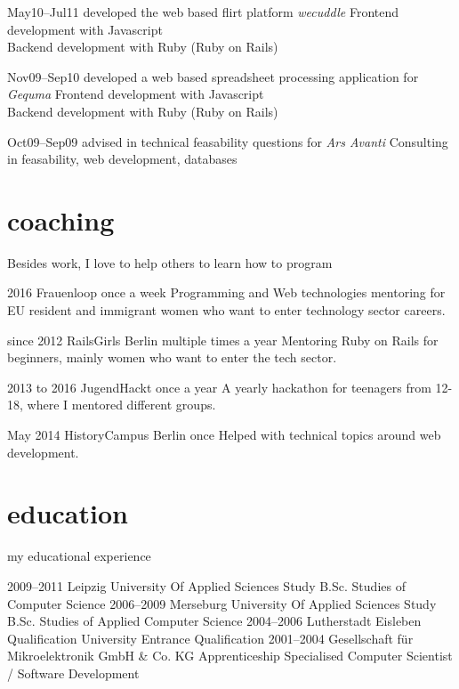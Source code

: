 \documentclass[]{friggeri-cv}
\begin{document}
\begin{entrylist}
  \entry
    {May10–Jul11}
    {developed the web based flirt platform \emph{wecuddle}}
    {}
    {Frontend development with Javascript\\
     Backend development with Ruby (Ruby on Rails)}

  \entry
    {Nov09–Sep10}
    {developed a web based spreadsheet processing application for \emph{Gequma}}
    {}
    {Frontend development with Javascript\\
     Backend development with Ruby (Ruby on Rails)}

  \entry
    {Oct09–Sep09}
    {advised in technical feasability questions for \emph{Ars Avanti}}
    {}
    {Consulting in feasability, web development, databases}


\end{entrylist}


\pagebreak
\section{coaching}
Besides work, I love to help others to learn how to program

\begin{entrylist}
  \entry
    {2016}
    {Frauenloop}
    {once a week}
    {Programming and Web technologies mentoring for EU resident and immigrant women who want to enter technology sector careers.}

  \entry
    {since 2012}
    {RailsGirls Berlin}
    {multiple times a year}
    {Mentoring Ruby on Rails for beginners, mainly women who want to enter the tech sector.}

  \entry
    {2013 to 2016}
    {JugendHackt}
    {once a year}
    {A yearly hackathon for teenagers from 12-18, where I mentored different groups.}

  \entry
    {May 2014}
    {HistoryCampus Berlin}
    {once}
    {Helped with technical topics around web development.}

\end{entrylist}


\section{education}
my educational experience

\begin{entrylist}
  \entry
    {2009–2011}
    {Leipzig University Of Applied Sciences}
    {Study B.Sc.}
    {Studies of Computer Science}
  \entry
    {2006–2009}
    {Merseburg University Of Applied Sciences}
    {Study B.Sc.}
    {Studies of Applied Computer Science}
  \entry
    {2004–2006}
    {Lutherstadt Eisleben}
    {Qualification}
    {University Entrance Qualification}
  \entry
    {2001–2004}
    {Gesellschaft für Mikroelektronik GmbH \& Co. KG}
    {Apprenticeship}
    {Specialised Computer Scientist / Software Development}
\end{entrylist}


%
\end{document}
